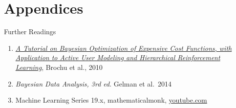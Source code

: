 \documentclass[10pt,ignorenonframetext,]{beamer}
\providecommand{\tightlist}{%
  \setlength{\itemsep}{0pt}\setlength{\parskip}{0pt}}
\begin{document}
\hypertarget{appendices}{%
\section{Appendices}\label{appendices}}

\begin{frame}{Further Readings}
\protect\hypertarget{further-readings}{}

\begin{enumerate}
\tightlist
\item
  \href{https://arxiv.org/pdf/1012.2599.pdf}{\emph{A Tutorial on
  Bayesian Optimization of Expensive Cost Functions, with Application to
  Active User Modeling and Hierarchical Reinforcement Learning}}, Brochu
  et al., 2010
\item
  \emph{Bayesian Data Analysis, 3rd ed}. Gelman et al.~2014
\item
  Machine Learning Series 19.x, mathematicalmonk,
  \href{https://www.youtube.com/watch?v=clMbOOz6yR0\&list=PLD0F06AA0D2E8FFBA\&index=152}{youtube.com}
\end{enumerate}

\end{frame}
\end{document}
